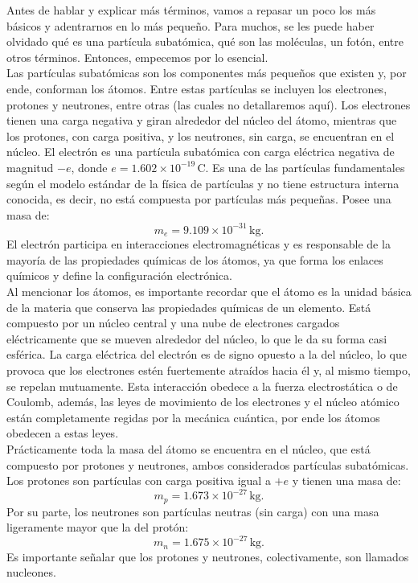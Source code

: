 \noindent 
Antes de hablar y explicar más términos, vamos a repasar un poco los más básicos y adentrarnos en lo más pequeño. Para muchos, se les puede haber olvidado qué es una partícula subatómica, qué son las moléculas, un fotón, entre otros términos. Entonces, empecemos por lo esencial.\\

\noindent 
Las partículas subatómicas son los componentes más pequeños que existen y, por ende, conforman los átomos. Entre estas partículas se incluyen los electrones, protones y neutrones, entre otras (las cuales no detallaremos aquí). Los electrones tienen una carga negativa y giran alrededor del núcleo del átomo, mientras que los protones, con carga positiva, y los neutrones, sin carga, se encuentran en el núcleo. El electrón es una partícula subatómica con carga eléctrica negativa de magnitud $-e$, donde $e = 1.602 \times 10^{-19} \, \text{C}$. Es una de las partículas fundamentales según el modelo estándar de la física de partículas y no tiene estructura interna conocida, es decir, no está compuesta por partículas más pequeñas. Posee una masa de:
\[
m_e = 9.109 \times 10^{-31} \, \text{kg}.
\]
\noindent 
El electrón participa en interacciones electromagnéticas y es responsable de la mayoría de las propiedades químicas de los átomos, ya que forma los enlaces químicos y define la configuración electrónica.\\

\noindent 
Al mencionar los átomos, es importante recordar que el átomo es la unidad básica de la materia que conserva las propiedades químicas de un elemento. Está compuesto por un núcleo central y una nube de electrones cargados eléctricamente que se mueven alrededor del núcleo, lo que le da su forma casi esférica. La carga eléctrica del electrón es de signo opuesto a la del núcleo, lo que provoca que los electrones estén fuertemente atraídos hacia él y, al mismo tiempo, se repelan mutuamente. Esta interacción obedece a la fuerza electrostática o de Coulomb, además, las leyes de movimiento de los electrones y el núcleo atómico están completamente regidas por la mecánica cuántica, por ende los átomos obedecen a estas leyes.\\

\noindent 
Prácticamente toda la masa del átomo se encuentra en el núcleo, que está compuesto por protones y neutrones, ambos considerados partículas subatómicas. Los protones son partículas con carga positiva igual a $+e$ y tienen una masa de:
\[
m_p = 1.673 \times 10^{-27} \, \text{kg}.
\]
\noindent 
Por su parte, los neutrones son partículas neutras (sin carga) con una masa ligeramente mayor que la del protón:
\[
m_n = 1.675 \times 10^{-27} \, \text{kg}.
\]
\noindent 
Es importante señalar que los protones y neutrones, colectivamente, son llamados nucleones.\\

